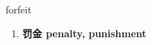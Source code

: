 
\begin{frame}
{\huge forfeit}
\begin{center}
\begin{enumerate}\Large
  \item \textbf{罚金 penalty, punishment}
\end{enumerate}
\end{center}
\end{frame}
